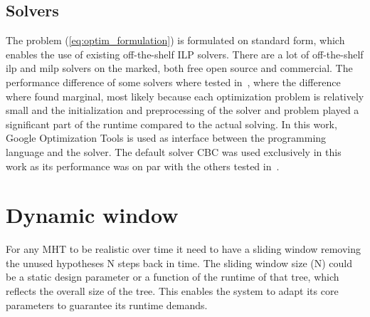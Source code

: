 \subsection{Solvers}
The problem (\ref{eq:optim_formulation}) is formulated on standard form, which enables the use of existing off-the-shelf ILP solvers. There are a lot of off-the-shelf \gls{ilp} and \gls{milp} solvers on the marked, both free open source and commercial. The performance difference of some solvers where tested in~\cite{Liland_2017}, where the difference where found marginal,  most likely because each optimization problem is relatively small and the initialization and preprocessing of the solver and problem played a significant part of the runtime compared to the actual solving. In this work, Google Optimization Tools is used as interface between the programming language and the solver. The default solver CBC was used exclusively in this work as its performance was on par with the others tested in~\cite{Liland_2017}. 

\section{Dynamic window}
For any MHT to be realistic over time it need to have a sliding window removing the unused hypotheses N steps back in time. The sliding window size (N) could be a static design parameter or a function of the runtime of that tree, which reflects the overall size of the tree. This enables the system to adapt its core parameters to guarantee its runtime demands.

